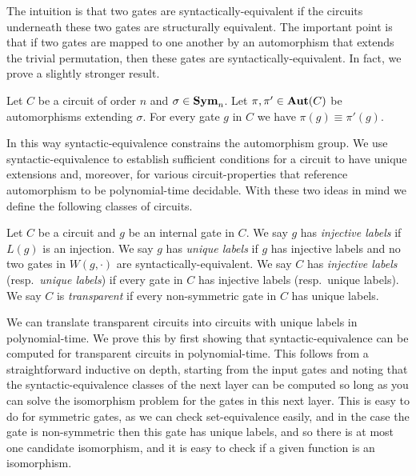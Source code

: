 \documentclass[a4paper,UKenglish]{lipics-v2018}
\begin{document}
The intuition is that two gates are syntactically-equivalent if the circuits
underneath these two gates are structurally equivalent. The important point is
that if two gates are mapped to one another by an automorphism that extends the
trivial permutation, then these gates are syntactically-equivalent. In fact, we
prove a slightly stronger result.

\begin{lemma}
  Let $C$ be a circuit of order $n$ and $\sigma \in \text{\textbf{Sym}}_n$. Let $\pi, \pi' \in
  \text{\textbf{Aut}}(C)$ be automorphisms extending $\sigma$. For every gate $g$ in $C$ we
  have $\pi (g) \equiv \pi' (g)$.
  \label{lem:permutation-extending-syntactic-equivalence}
\end{lemma}

In this way syntactic-equivalence constrains the automorphism group. We use
syntactic-equivalence to establish sufficient conditions for a circuit to have
unique extensions and, moreover, for various circuit-properties that reference
automorphism to be polynomial-time decidable. With these two ideas in mind we
define the following classes of circuits.

\begin{definition}
  Let $C$ be a circuit and $g$ be an internal gate in $C$. We say $g$ has
  \emph{injective labels} if $L(g)$ is an injection. We say $g$ has \emph{unique
    labels} if $g$ has injective labels and no two gates in $W(g, \cdot)$ are
  syntactically-equivalent. We say $C$ has \emph{injective labels} (resp.\
  \emph{unique labels}) if every gate in $C$ has injective labels (resp.\ unique
  labels). We say $C$ is \emph{transparent} if every non-symmetric gate in $C$
  has unique labels.
\end{definition}

We can translate transparent circuits into circuits with unique labels in
polynomial-time. We prove this by first showing that syntactic-equivalence can
be computed for transparent circuits in polynomial-time. This follows from a
straightforward inductive on depth, starting from the input gates and noting
that the syntactic-equivalence classes of the next layer can be computed so long
as you can solve the isomorphism problem for the gates in this next layer. This
is easy to do for symmetric gates, as we can check set-equivalence easily, and
in the case the gate is non-symmetric then this gate has unique labels, and so
there is at most one candidate isomorphism, and it is easy to check if a given
function is an isomorphism.
\end{document}
